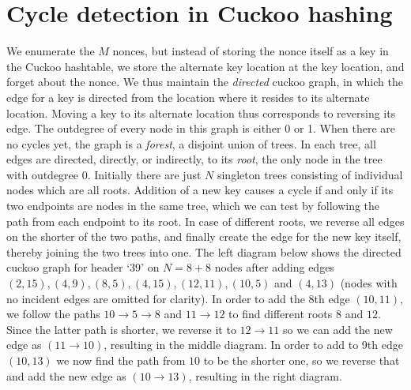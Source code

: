 \documentclass[11pt, oneside]{article}
\begin{document}
\section{Cycle detection in Cuckoo hashing}
We enumerate the $M$ nonces, but instead of storing the nonce itself as a key
in the Cuckoo hashtable, we store the alternate key location at the key
location, and forget about the nonce.  We thus maintain the {\em directed}
cuckoo graph, in which the edge for a key is directed from the location where
it resides to its alternate location.  Moving a key to its alternate location
thus corresponds to reversing its edge.  The outdegree of every node in this
graph is either 0 or 1.  When there are no cycles yet, the graph is a {\em
forest}, a disjoint union of trees.  In each tree, all edges are directed,
directly, or indirectly, to its {\em root}, the only node in the tree with
outdegree 0.  Initially there are just $N$ singleton trees consisting of
individual nodes which are all roots.
Addition of a new key causes a cycle if and only if its two endpoints are
nodes in the same tree, which we can test by following the path from each
endpoint to its root.
In case of different roots, we reverse all edges on the shorter of the two
paths, and finally create the edge for the new key itself, thereby joining
the two trees into one.
The left diagram below shows the directed cuckoo graph for header `39' on
$N=8+8$ nodes after adding edges
$(2,15),(4,9),(8,5),(4,15),(12,11),(10,5)$ and $(4,13)$ (nodes
with no incident edges are omitted for clarity).
In order to add the 8th edge $(10,11)$, we follow the paths $10 \rightarrow 5
\rightarrow 8$ and $11 \rightarrow 12$ to find different roots $8$ and $12$.
Since the latter path is shorter, we reverse it to $12 \rightarrow 11$ so we
can add the new edge as $(11 \rightarrow 10)$, resulting in the middle diagram.
In order to add to 9th edge
$(10,13)$ we now find the path from $10$ to be the shorter one, so we reverse
that and add the new edge as $(10 \rightarrow 13)$, resulting in the right diagram.
\end{document}
